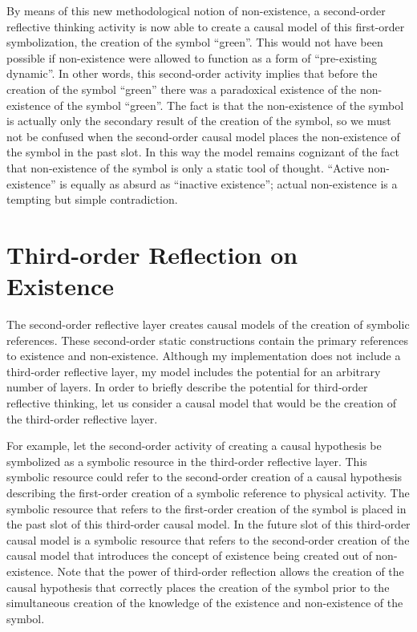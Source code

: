 By means of this new methodological notion of non-existence, a
second-order reflective thinking activity is now able to create a
causal model of this first-order symbolization, the creation of the
symbol ``green''.  This would not have been possible if non-existence
were allowed to function as a form of ``pre-existing dynamic''.  In
other words, this second-order activity implies that before the
creation of the symbol ``green'' there was a paradoxical existence of
the non-existence of the symbol ``green''.  The fact is that the
non-existence of the symbol is actually only the secondary result of
the creation of the symbol, so we must not be confused when the
second-order causal model places the non-existence of the symbol in
the past slot.  In this way the model remains cognizant of the fact
that non-existence of the symbol is only a static tool of thought.
``Active non-existence'' is equally as absurd as ``inactive
existence''; actual non-existence is a tempting but simple
contradiction.

\section{Third-order Reflection on Existence}

The second-order reflective layer creates causal models of the
creation of symbolic references.  These second-order static
constructions contain the primary references to existence and
non-existence.  Although my implementation does not include a
third-order reflective layer, my model includes the potential for an
arbitrary number of layers.  In order to briefly describe the
potential for third-order reflective thinking, let us consider a
causal model that would be the creation of the third-order reflective
layer.

For example, let the second-order activity of creating a causal
hypothesis be symbolized as a symbolic resource in the third-order
reflective layer.  This symbolic resource could refer to the
second-order creation of a causal hypothesis describing the
first-order creation of a symbolic reference to physical activity.
The symbolic resource that refers to the first-order creation of the
symbol is placed in the past slot of this third-order causal model.
In the future slot of this third-order causal model is a symbolic
resource that refers to the second-order creation of the causal model
that introduces the concept of existence being created out of
non-existence.  Note that the power of third-order reflection allows
the creation of the causal hypothesis that correctly places the
creation of the symbol prior to the simultaneous creation of the
knowledge of the existence and non-existence of the symbol.

